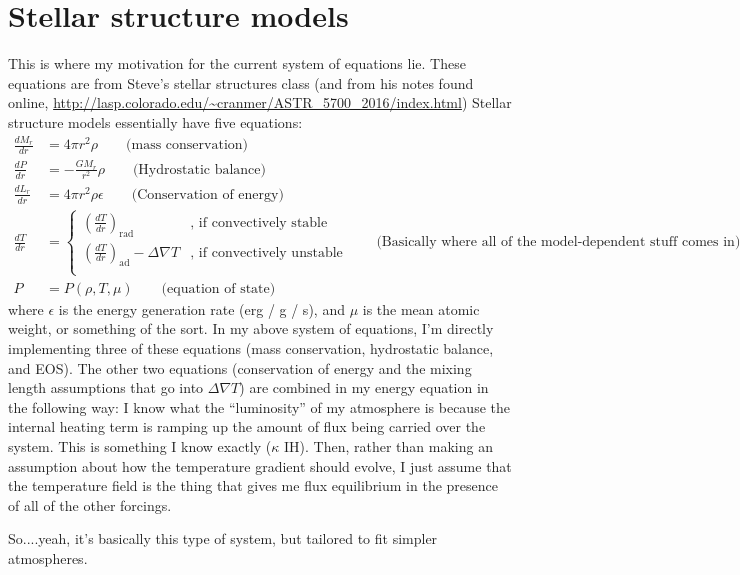 \documentclass[aps, pre, onecolumn, nofootinbib, notitlepage, groupedaddress, amsfonts, amssymb, amsmath, longbibliography]{revtex4-1}
\newcommand{\grad}{\ensuremath{\nabla}}
\begin{document}
\section{Stellar structure models}
This is where my motivation for the current system of equations lie.
These equations are from Steve's stellar structures class (and from his notes found online,
\url{http://lasp.colorado.edu/~cranmer/ASTR_5700_2016/index.html}) 
Stellar structure models essentially have five equations:
\begin{equation}
\begin{split}
\frac{d M_r}{dr} &= 4\pi r^2 \rho \qquad \text{(mass conservation)} \\
\frac{d P}{dr} &= -\frac{G M_r}{r^2}\rho \qquad \text{(Hydrostatic balance)} \\
\frac{d L_r}{dr} &= 4\pi r^2 \rho \epsilon \qquad \text{(Conservation of energy)} \\
\frac{d T}{dr} &= \begin{cases}
\left(\frac{dT}{dr}\right)_{\text{rad}} & \text{, if convectively stable}\\
\left(\frac{dT}{dr}\right)_{\text{ad}} - \Delta\grad T & \text{, if convectively unstable}\\
\end{cases} \qquad \text{(Basically where all of the model-dependent stuff comes in)} \\
P &= P(\rho, T, \mu)  \qquad \text{(equation of state)}
\end{split}
\end{equation}
where $\epsilon$ is the energy generation rate (erg / g / s), and $\mu$ is the
mean atomic weight, or something of the sort.  In my above system of equations,
I'm directly implementing three of these equations (mass conservation, hydrostatic
balance, and EOS).  The other two equations (conservation of energy and the mixing
length assumptions that go into $\Delta \grad T$) are combined in my energy equation
in the following way:  I know what the ``luminosity'' of my atmosphere is because
the internal heating term is ramping up the amount of flux being carried over the
system.  This is something I know exactly ($\kappa$ IH).  Then, rather than making an assumption
about how the temperature gradient should evolve, I just assume that the temperature field is the thing
that gives me flux equilibrium in the presence of all of the other forcings.

So....yeah, it's basically this type of system, but tailored to fit simpler atmospheres.



\end{document}
